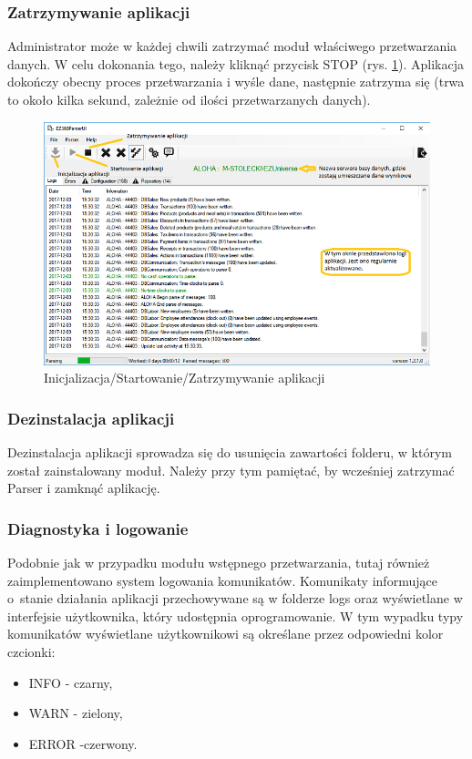 \documentclass[a4paper]{book}
\begin{document}
\subsubsection{Zatrzymywanie aplikacji}
Administrator może w każdej chwili zatrzymać moduł właściwego przetwarzania danych. W celu dokonania tego, należy kliknąć przycisk STOP (rys. \ref{fig:zatrzymywanie_aplikacji}). Aplikacja dokończy obecny proces przetwarzania i wyśle dane, następnie zatrzyma się (trwa to około kilka sekund, zależnie od ilości przetwarzanych danych).
\begin{figure}[t]
	\centering
	\includegraphics[width=200mm]{./img/zatrzymywanie_aplikacji.png}
	\caption{Inicjalizacja/Startowanie/Zatrzymywanie aplikacji}
	\label{fig:zatrzymywanie_aplikacji}
\end{figure}
\subsubsection{Dezinstalacja aplikacji}
Dezinstalacja aplikacji sprowadza się do usunięcia zawartości folderu, w którym został zainstalowany moduł. Należy przy tym pamiętać, by wcześniej zatrzymać Parser i zamknąć aplikację.
\subsubsection{Diagnostyka i logowanie}
Podobnie jak w przypadku modułu wstępnego przetwarzania, tutaj również zaimplementowano system logowania komunikatów. Komunikaty informujące o~stanie działania aplikacji przechowywane są w folderze logs oraz wyświetlane w interfejsie użytkownika, który udostępnia oprogramowanie. W tym wypadku typy komunikatów wyświetlane użytkownikowi są określane przez odpowiedni kolor czcionki:
 \begin{itemize}
 	\item INFO - czarny,
 	\item WARN - zielony,
 	\item ERROR -czerwony.
 \end{itemize}
\end{document}
